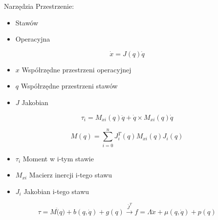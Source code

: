 \documentclass{beamer}
\begin{document}
\begin{frame}[allowframebreaks]{Narzędzia}
	Przestrzenie:
	\begin{itemize}
		\item Stawów
		\item Operacyjna
	\end{itemize}

	\begin{equation}
		\dot{x} = J(q)\dot{q}
	\end{equation}
	\begin{itemize}
	\item $x$ Współrzędne przestrzeni operacyjnej
	\item $q$ Współrzędne przestrzeni stawów
	\item $J$ Jakobian
\end{itemize}
\framebreak

	\begin{equation}
	\tau_i = M_{xi}(q)\ddot{q} + \dot{q} \times M_{xi}(q)\dot{q}
	\end{equation}

	\begin{equation}
	M(q) = \sum_{i=0}^{n}J_i^T(q)M_{xi}(q)J_i(q)
	\end{equation}
	\begin{itemize}
	\item $\tau_i$ Moment w i-tym stawie
	\item $M_{xi}$ Macierz inercji i-tego stawu
	\item $J_i$ Jakobian i-tego stawu
\end{itemize}

	\framebreak
	\begin{equation}
	\tau = M\ddot(q) + b(q, \dot{q}) + g(q) \xrightarrow{\bar{J}^T} f = \Lambda\ddot{x} + \mu(q, \dot{q}) + p(q)
	\end{equation}






\end{frame}
\end{document}
